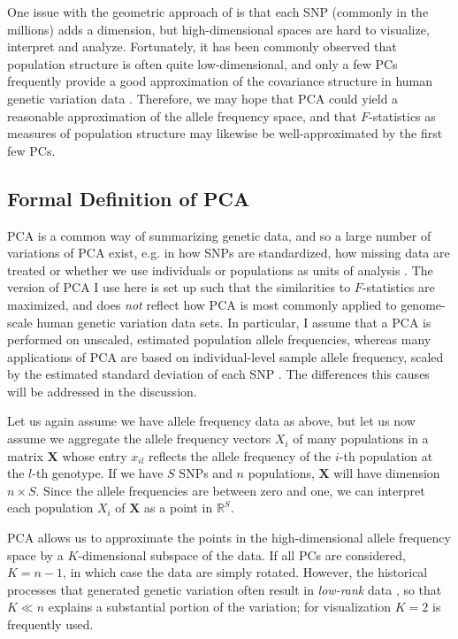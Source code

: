 \documentclass[12pt,fullpage, a4paper]{article}
\newcommand{\MX}{\mathbf{X}} %
\begin{document}
One issue with the geometric approach of \cite{oteo-garcia2021} is that  each SNP (commonly in the millions) adds a dimension, but high-dimensional spaces are hard to visualize, interpret and analyze. Fortunately, it has been commonly observed that population structure is often quite low-dimensional, and only a  few PCs frequently provide a good approximation of the covariance structure in human genetic variation data \citep{patterson2006}. Therefore, we may hope that PCA could yield a reasonable approximation of the allele frequency space, and that $F$-statistics as measures of population structure may likewise be well-approximated by the first few PCs.





\subsection{Formal Definition of PCA}
PCA is a common way of summarizing genetic data, and so a large number of variations of PCA exist, e.g. in how SNPs are standardized, how missing data are treated or whether we use individuals or populations as units of analysis \citep{cavalli-sforza1994, patterson2006}. The version of PCA I use here is set up such that the similarities to  $F$-statistics are maximized, and does \emph{not} reflect how PCA is most commonly applied to genome-scale human genetic variation data sets. In particular, I assume that a PCA is performed on unscaled, estimated population allele frequencies, whereas many applications of PCA are based on individual-level sample allele frequency, scaled by the estimated standard deviation of each SNP \citep{patterson2006}. The differences this causes will be addressed in the discussion.

Let us again assume we have allele frequency data as above, but let us now assume we aggregate the allele frequency vectors $X_i$ of many populations in a matrix $\MX$ whose entry $x_{il}$ reflects the allele frequency of the $i$-th population at the $l$-th genotype. If we have $S$ SNPs and $n$ populations, $\MX$ will have dimension $n \times S$. Since the allele frequencies are between zero and one, we can interpret each population $X_i$
of $\MX$ as a point in $\mathbb{R}^S$.
	
PCA allows us to approximate the points in the high-dimensional allele frequency space by a $K$-dimensional subspace of the  data. If all PCs are considered, $K=n-1$, in which case the data are simply rotated. However, the  historical processes that generated genetic variation often result in \emph{low-rank} data \citep{engelhardt2010}, so that $K \ll n$ explains a substantial portion of the variation; for visualization $K=2$ is frequently used. 
		
\end{document}
